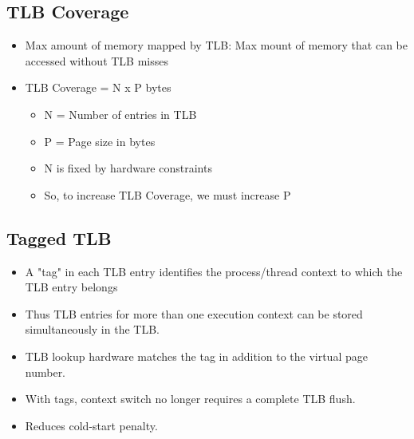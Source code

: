 \documentclass[12pt]{article}
\begin{document}
\subsection{TLB Coverage}
\begin{itemize}
    \item Max amount of memory mapped by TLB: Max mount of memory that can be accessed without TLB misses
    \item TLB Coverage = N x P bytes \begin{itemize}
        \item N = Number of entries in TLB
        \item P = Page size in bytes
        \item N is fixed by hardware constraints
        \item So, to increase TLB Coverage, we must increase P
    \end{itemize}
\end{itemize}
\subsection{Tagged TLB}
\begin{itemize}
    \item A "tag" in each TLB entry identifies the process/thread context to which the TLB entry belongs
    \item Thus TLB entries for more than one execution context can be stored simultaneously in the TLB.
    \item TLB lookup hardware matches the tag in addition to the virtual page number.
    \item With tags, context switch no longer requires a complete TLB flush.
    \item Reduces cold-start penalty.
\end{itemize}
\end{document}
